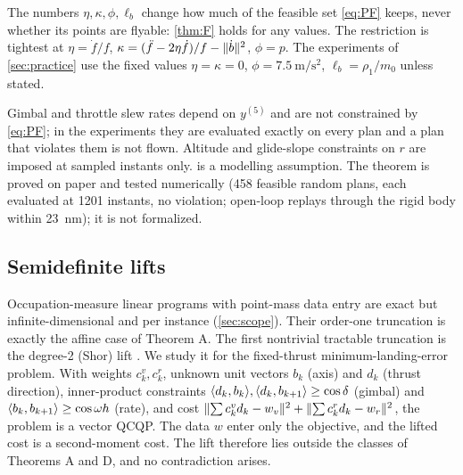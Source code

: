 \begin{remark}[References]\label{rem:F-refs}
The numbers $\eta,\kappa,\phi,\ell_b$ change how much of the feasible set \eqref{eq:PF} keeps, never whether its points are flyable:
\cref{thm:F} holds for any values. The restriction is tightest at $\eta=\dot f/f$, $\kappa=(\ddot f-2\eta\dot f)/f-\lVert \dot b\rVert^2$, $\phi=p$.
The experiments of \cref{sec:practice} use the fixed values $\eta=\kappa=0$, $\phi=7.5~\mathrm{m/s^2}$, $\ell_b=\rho_1/m_0$ unless stated.
\end{remark}
\begin{remark}\label{rem:F-scope}
Gimbal and throttle slew rates depend on $y^{(5)}$ and are not constrained by \eqref{eq:PF}; in the experiments they are evaluated
exactly on every plan and a plan that violates them is not flown. Altitude and glide-slope constraints on $r$ are imposed at sampled
instants only.  is a modelling assumption. The theorem is proved on paper and tested numerically (458 feasible random
plans, each evaluated at 1201 instants, no violation; open-loop replays through the rigid body within 23~nm); it is not formalized.
\end{remark}

\subsection{Semidefinite lifts}\label{sec:sdp}
Occupation-measure linear programs with point-mass data entry are exact but infinite-dimensional and per instance
(\cref{sec:scope}). Their order-one truncation is exactly the affine case of Theorem A. The first nontrivial tractable
truncation is the degree-2 (Shor) lift \cite{shor1987,lasserre2001siopt}. We study it for the fixed-thrust
minimum-landing-error problem. With weights $c^v_k,c^r_k$, unknown unit vectors $b_k$ (axis) and $d_k$ (thrust direction),
inner-product constraints $\langle d_k,b_k\rangle,\langle d_k,b_{k+1}\rangle\ge\cos\delta$ (gimbal) and $\langle b_k,b_{k+1}\rangle\ge\cos\omega h$ (rate), and
cost $\lVert \sum c^v_kd_k-w_v\rVert^2+\lVert \sum c^r_kd_k-w_r\rVert^2$, the problem is a vector QCQP. The data $w$ enter only the
objective, and the lifted cost is a second-moment cost. The lift therefore lies outside the classes of Theorems A and D, and
no contradiction arises.

